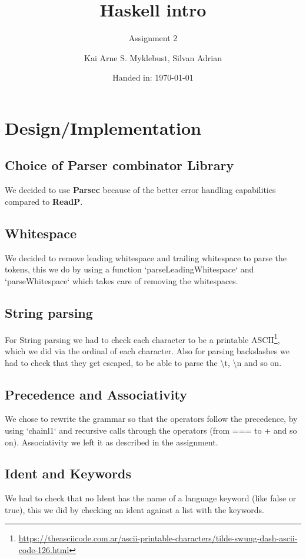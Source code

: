 \documentclass[12pt,a4paper]{article}
\begin{document}
\title{Haskell intro}
\subtitle{Assignment 2}

\author{Kai Arne S. Myklebust, Silvan Adrian}
\date{Handed in: \today}
	
\maketitle
\tableofcontents

\section{Design/Implementation}

\subsection{Choice of Parser combinator Library}
We decided to use \textbf{Parsec} because of the better error handling capabilities compared to \textbf{ReadP}.

\subsection{Whitespace}
We decided to remove leading whitespace and trailing whitespace to parse the tokens, this we do by using a function `parseLeadingWhitespace` and `parseWhitespace` which takes care of removing the whitespaces.

\subsection{String parsing}
For String parsing we had to check each character to be a printable ASCII\footnote{\url{https://theasciicode.com.ar/ascii-printable-characters/tilde-swung-dash-ascii-code-126.html}}, which we did via the ordinal of each character.
Also for parsing backslashes we had to check that they get escaped, to be able to parse the \textbackslash{t}, \textbackslash{n} and so on.

\subsection{Precedence and Associativity}
We chose to rewrite the grammar so that the operators follow the precedence, by using `chainl1` and recursive calls through the operators (from === to + and so on).
Associativity we left it as described in the assignment.

\subsection{Ident and Keywords}
We had to check that no Ident has the name of a language keyword (like false or true), this we did by checking an ident against a list with the keywords.
\end{document}
